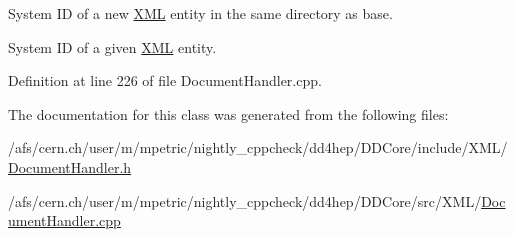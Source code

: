 System ID of a new \hyperlink{namespace_d_d4hep_1_1_x_m_l}{X\+ML} entity in the same directory as base. 

System ID of a given \hyperlink{namespace_d_d4hep_1_1_x_m_l}{X\+ML} entity. 

Definition at line 226 of file Document\+Handler.\+cpp.



The documentation for this class was generated from the following files\+:\begin{DoxyCompactItemize}
\item 
/afs/cern.\+ch/user/m/mpetric/nightly\+\_\+cppcheck/dd4hep/\+D\+D\+Core/include/\+X\+M\+L/\hyperlink{_document_handler_8h}{Document\+Handler.\+h}\item 
/afs/cern.\+ch/user/m/mpetric/nightly\+\_\+cppcheck/dd4hep/\+D\+D\+Core/src/\+X\+M\+L/\hyperlink{_document_handler_8cpp}{Document\+Handler.\+cpp}\end{DoxyCompactItemize}
